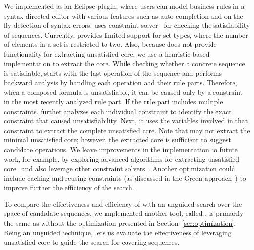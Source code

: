 We implemented \tool{} as an Eclipse plugin, where users can model business
rules in a syntax-directed editor with various features such as auto completion
and on-the-fly detection of syntax errors. \tool{} uses \choco{} constraint
solver~\cite{Choco} for checking the satisfiability of sequences.  Currently,
\tool{} provides limited support for set types, where the number of elements in
a set is restricted to two. Also, because \choco{} does not provide
functionality for extracting unsatisfied core, we use a heuristic-based
implementation to extract the core. While checking whether a concrete sequence
is satisfiable, \tool{} starts with the last operation of the sequence and
performs backward analysis by handling each operation and their rule
parts. Therefore, when a composed formula is unsatisfiable, it can be caused
only by a constraint in the most recently analyzed rule part. If the rule part
includes multiple constraints, \tool{} further analyzes each individual
constraint to identify the exact constraint that caused unsatisfiability. Next,
it uses the variables involved in that constraint to extract the complete
unsatisfied core. Note that \tool{} may not extract the minimal unsatisfied
core; however, the extracted core is sufficient to suggest candidate
operations. We leave improvements in the implementation to future work, for
example, by exploring advanced algorithms for extracting unsatisfied
core~\cite{Liffiton:2008:ACM} and also leverage other constraint
solvers~\cite{DeMoura:2008}. Another optimization could include caching and
reusing constraints (\eg as discussed in the Green approach~\cite{VisserGD12})
to improve further the efficiency of the search.

To compare the effectiveness and efficiency of \tool{} with an unguided search
over the space of candidate sequences, we implemented another tool, called
\exhaust{}. \exhaust{} is primarily the same as \tool{} without the optimization
presented in Section~\ref{sec:optimization}. Being an unguided technique, \exhaust{} lets us evaluate the
effectiveness of leveraging unsatisfied core to guide the search for covering
sequences.

